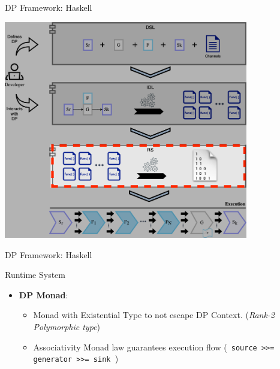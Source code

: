 \documentclass{beamer}
\begin{document}
  \begin{frame}[fragile]{DP Framework: Haskell}
    \begin{center}
      \includegraphics[width = 0.8\textwidth, height = 0.8\textheight]{dpf_haskell_v3-3}
    \end{center}
  \end{frame}

  \begin{frame}[fragile]{DP Framework: Haskell}
    \begin{block}{Runtime System}
      \begin{itemize}
        \item \textbf{DP Monad}:
        \begin{itemize} 
        \item Monad with Existential Type to not escape DP Context. (\textit{Rank-2 Polymorphic type})
        \item Associativity Monad law guarantees execution flow (\texttt{ source >>= generator >>= sink }) 
        \end{itemize}
      \end{itemize}
    \end{block}
    \end{frame}
  
\end{document}
